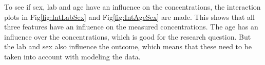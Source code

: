 \documentclass{article}
\begin{document}
      To see if sex, lab and age have an influence on the concentrations, the interaction plots in Fig\ref{fig:IntLabSex} and Fig\ref{fig:IntAgeSex} are made.
      This shows that all three features have an influence on the measured concentrations.
      The age has an influence over the concentrations, which is good for the research question. 
      But the lab and sex also influence the outcome, which means that these need to be taken into account with modeling the data.

      \begin{figure}[H]
          \centering

\end{figure}
\end{document}
